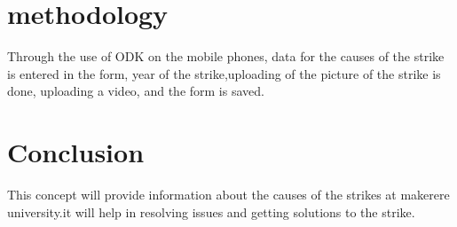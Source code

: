 \documentclass{article}
\begin{document}
\section{methodology}
Through the use of ODK on the mobile phones, data for the causes of the strike is entered in the form, year of the strike,uploading of the picture of the strike is done, uploading a video, and the form is saved. 
    

\section{Conclusion}
This concept will provide information about the causes of the strikes at makerere university.it will help in resolving issues and getting solutions to the strike. 
  
\end{document}
